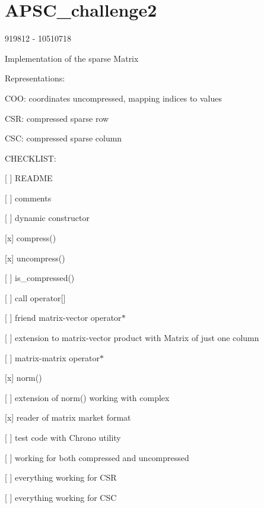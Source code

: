 \chapter{APSC\+\_\+challenge2}
\hypertarget{md_README}{}\label{md_README}
\label{md_README_autotoc_md0}%
%
 919812 -\/ 10510718

Implementation of the sparse Matrix

Representations\+:


\begin{DoxyItemize}
\item COO\+: coordinates uncompressed, mapping indices to values
\item CSR\+: compressed sparse row
\item CSC\+: compressed sparse column
\end{DoxyItemize}

CHECKLIST\+:


\begin{DoxyItemize}
\item \mbox{[} \mbox{]} README
\item \mbox{[} \mbox{]} comments
\item \mbox{[} \mbox{]} dynamic constructor
\item \mbox{[}x\mbox{]} {\ttfamily compress()}
\item \mbox{[}x\mbox{]} {\ttfamily uncompress()}
\item \mbox{[} \mbox{]} {\ttfamily is\+\_\+compressed()}
\item \mbox{[} \mbox{]} call {\ttfamily operator\mbox{[}\mbox{]}}
\item \mbox{[} \mbox{]} friend matrix-\/vector {\ttfamily operator\texorpdfstring{$\ast$}{*}}
\item \mbox{[} \mbox{]} extension to matrix-\/vector product with {\ttfamily Matrix} of just one column
\item \mbox{[} \mbox{]} matrix-\/matrix {\ttfamily operator\texorpdfstring{$\ast$}{*}}
\item \mbox{[}x\mbox{]} {\ttfamily norm()}
\item \mbox{[} \mbox{]} extension of {\ttfamily norm()} working with complex
\item \mbox{[}x\mbox{]} reader of matrix market format
\item \mbox{[} \mbox{]} test code with {\ttfamily Chrono} utility
\item \mbox{[} \mbox{]} working for both compressed and uncompressed
\item \mbox{[} \mbox{]} everything working for CSR
\item \mbox{[} \mbox{]} everything working for CSC 
\end{DoxyItemize}